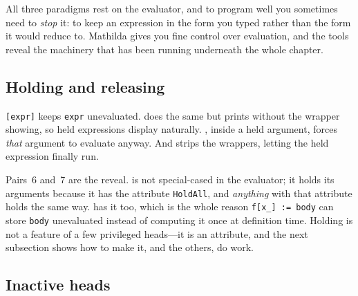 All three paradigms rest on the evaluator, and to program well you sometimes need
to \emph{stop} it: to keep an expression in the form you typed rather than the
form it would reduce to. Mathilda gives you fine control over evaluation, and the
tools reveal the machinery that has been running underneath the whole chapter.

\subsection{Holding and releasing}
\label{ssec:prog-hold}

\texttt{[expr]} keeps \texttt{expr} unevaluated.  does the
same but prints without the wrapper showing, so held expressions display
naturally. , inside a held argument, forces \emph{that} argument to
evaluate anyway. And  strips the wrappers, letting the held
expression finally run.

\begin{codepairs}
\end{codepairs}

Pairs~6 and~7 are the reveal.  is not special-cased in the evaluator; it
holds its arguments because it has the attribute \texttt{HoldAll}, and
\emph{anything} with that attribute holds the same way.  has it too,
which is the whole reason \texttt{f[x\_] := body} can store \texttt{body}
unevaluated instead of computing it once at definition time. Holding is not a
feature of a few privileged heads---it is an attribute, and the next subsection
shows how to make it, and the others, do work.

\subsection{Inactive heads}
\label{ssec:prog-inactive}

